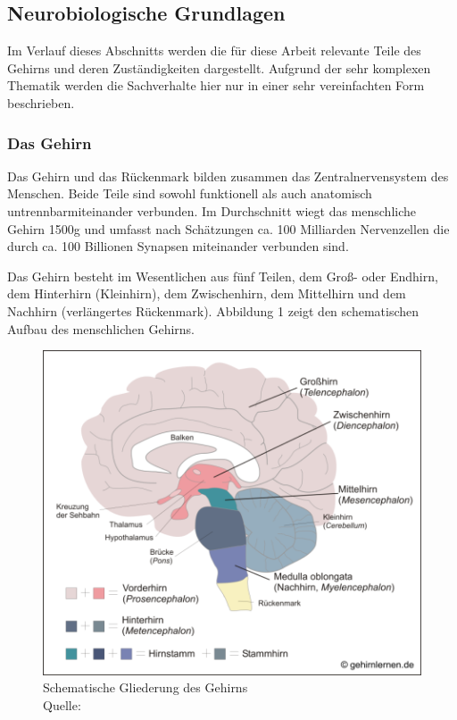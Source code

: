 \subsection{Neurobiologische Grundlagen}
Im Verlauf dieses Abschnitts werden die für diese Arbeit relevante Teile des Gehirns und deren Zuständigkeiten dargestellt. Aufgrund der sehr komplexen Thematik werden die Sachverhalte hier nur in einer sehr vereinfachten Form beschrieben. 

\subsubsection{Das Gehirn}
Das Gehirn und das Rückenmark bilden zusammen das Zentralnervensystem des Menschen. Beide Teile sind \glqq sowohl funktionell als auch anatomisch untrennbar\grqq miteinander verbunden. \citep[S. 105]{Kirschbaum.2008} Im Durchschnitt wiegt das menschliche Gehirn 1500g und umfasst nach Schätzungen  ca. 100 Milliarden Nervenzellen die durch ca. 100 Billionen Synapsen miteinander verbunden sind. \citep{Weber.2011}

Das Gehirn besteht im Wesentlichen aus fünf Teilen, dem Groß- oder Endhirn, dem Hinterhirn (Kleinhirn), dem Zwischenhirn, dem Mittelhirn und dem Nachhirn (verlängertes Rückenmark). \citep{Schaefers.2014} Abbildung 1 zeigt den schematischen Aufbau des menschlichen Gehirns.

\begin{figure}[!h]
\centering
\includegraphics[width=0.8\linewidth]{grafiken/abb1.png}
\caption{Schematische Gliederung des Gehirns \\ Quelle: \cite{Schaefers.2014}}
\label{fig:Gehirn1}
\end{figure}

